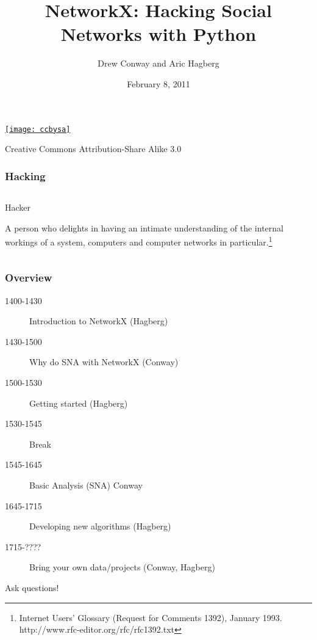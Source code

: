 \documentclass[xcolor=dvipsnames, 9pt]{beamer}
\title{NetworkX: Hacking Social Networks with Python}
\author{Drew Conway and Aric Hagberg}
\date{February 8, 2011}
\begin{document}
\begin{frame}[plain]
\titlepage

\tiny
\href{http://creativecommons.org/licenses/by-sa/3.0/us/}{\texttt{[image: ccbysa]}}

Creative Commons Attribution-Share Alike 3.0 
\end{frame}

\begin{frame}
\frametitle{Hacking}

\begin{columns}
\begin{column}{0.7\columnwidth}
\LARGE
Hacker

      A person who delights in having an intimate understanding of the
      internal workings of a system, computers and computer networks in
      particular.\footnote{
Internet Users' Glossary (Request for Comments 1392), January 1993.
http://www.rfc-editor.org/rfc/rfc1392.txt}
  
\end{column}
\end{columns}


\end{frame}

\begin{frame}
\frametitle{Overview}

\begin{description}

\item[1400-1430] Introduction to NetworkX (Hagberg)

\item[1430-1500]  Why do SNA with NetworkX (Conway)

\item[1500-1530] Getting started (Hagberg)

\item[1530-1545] Break

\item[1545-1645]  Basic Analysis (SNA) Conway

\item[1645-1715] Developing new algorithms (Hagberg)

\item[1715-????] Bring your own data/projects (Conway, Hagberg)

\end{description}

Ask questions!

\end{frame}
\end{document}
